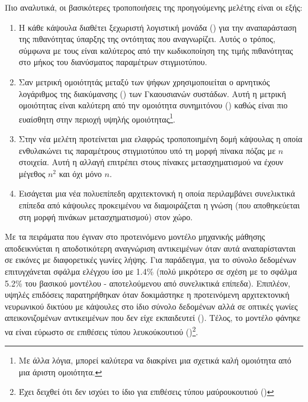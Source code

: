Πιο αναλυτικά, οι βασικότερες τροποποιήσεις της προηγούμενης μελέτης είναι οι εξής:
\begin{enumerate}
    \item Η κάθε κάψουλα διαθέτει ξεχωριστή λογιστική μονάδα () για την αναπαράσταση της πιθανότητας ύπαρξης της οντότητας που αναγνωρίζει. Αυτός ο τρόπος, σύμφωνα με τους \cite{hinton2018matrix} είναι καλύτερος από την κωδικοποίηση της τιμής πιθανότητας στο μήκος του διανύσματος παραμέτρων στιγμιοτύπου.
    \item Σαν μετρική ομοιότητάς μεταξύ των ψήφων χρησιμοποιείται ο αρνητικός λογάριθμος της διακύμανσης () των Γκαουσιανών συστάδων. Αυτή η μετρική ομοιότητας είναι καλύτερη από την ομοιότητα συνημιτόνου () καθώς είναι πιο ευαίσθητη στην περιοχή υψηλής ομοιότητας\footnote{Με άλλα λόγια, μπορεί καλύτερα να διακρίνει μια σχετικά καλή ομοιότητα από μια άριστη ομοιότητα.}.
    \item Στην νέα μελέτη προτείνεται μια ελαφρώς τροποποιημένη δομή κάψουλας η οποία ενθυλακώνει τις παραμέτρους στιγμιοτύπου υπό τη μορφή πίνακα πόζας με $n$ στοιχεία. Αυτή η αλλαγή επιτρέπει στους πίνακες μετασχηματισμού να έχουν μέγεθος $n^2$ και όχι μόνο $n$.
    \item Εισάγεται μια νέα πολυεπίπεδη αρχιτεκτονική η οποία περιλαμβάνει συνελικτικά επίπεδα από κάψουλες προκειμένου να διαμοιράζεται η γνώση (που αποθηκεύεται στη μορφή πινάκων μετασχηματισμού) στον χώρο.
\end{enumerate}\par

Με τα πειράματα που έγιναν στο προτεινόμενο μοντέλο μηχανικής μάθησης αποδεικνύεται η αποδοτικότερη αναγνώριση αντικειμένων όταν αυτά αναπαρίστανται σε εικόνες με διαφορετικές γωνίες λήψης. Για παράδειγμα, για το σύνολο δεδομένων  επιτυγχάνεται σφάλμα ελέγχου ίσο με 1.4\% (πολύ μικρότερο σε σχέση με το σφάλμα 5.2\% του βασικού μοντέλου - αποτελούμενου από συνελικτικά επίπεδα). Επιπλέον, υψηλές επιδόσεις παρατηρήθηκαν όταν δοκιμάστηκε η προτεινόμενη αρχιτεκτονική νευρωνικού δικτύου με κάψουλες στο ίδιο σύνολο δεδομένων αλλά σε οπτικές γωνίες απεικονιζομένων αντικειμένων που δεν είχε εκπαιδευτεί (). Τέλος, το μοντέλο φάνηκε να είναι εύρωστο σε επιθέσεις τύπου λευκού\textendash κουτιού ()\cite{goodfellow2014explaining}\footnote{Έχει δειχθεί ότι δεν ισχύει το ίδιο για επιθέσεις τύπου μαύρου\textendash κουτιού ()}. 

